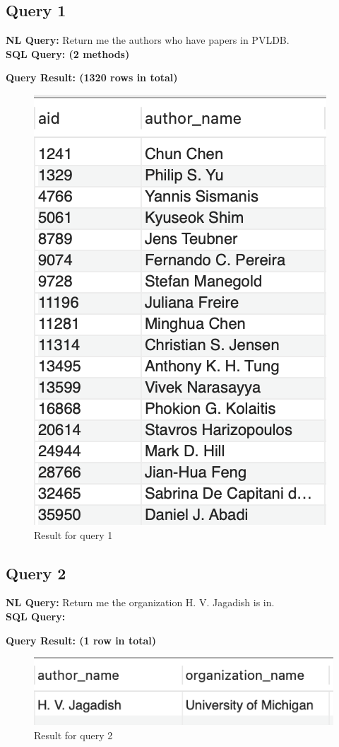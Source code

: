 \documentclass{article}
\begin{document}
\subsection{Query 1}
\textbf{NL Query:} Return me the authors who have papers in PVLDB.
\vspace{6 pt}
\\
\textbf{SQL Query: (2 methods) }

\newpage
\textbf{Query Result: (1320 rows in total)}
\begin{figure}[h]
	\centering
	\includegraphics[width=.17\textheight]{figures/q1_res.png}
	\caption{Result for query 1}
	\label{fig:002}
\end{figure}
\subsection{Query 2}
\textbf{NL Query:} Return me the organization H. V. Jagadish is in.
\vspace{6 pt}
\\
\textbf{SQL Query: }

\textbf{Query Result: (1 row in total)}
\begin{figure}[h]
	\centering
	\includegraphics[width=.25\textheight]{figures/q2_res.png}
	\caption{Result for query 2}
	\label{fig:003}
\end{figure}
\end{document}
